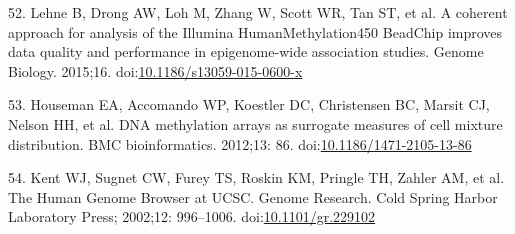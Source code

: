 \documentclass[]{article}
\theoremstyle{definition}
\theoremstyle{definition}
\theoremstyle{definition}
\theoremstyle{remark}
\begin{document}
52. Lehne B, Drong AW, Loh M, Zhang W, Scott WR, Tan ST, et al. A
coherent approach for analysis of the Illumina HumanMethylation450
BeadChip improves data quality and performance in epigenome-wide
association studies. Genome Biology. 2015;16.
doi:\href{http://dx.doi.org/10.1186/s13059-015-0600-x}{10.1186/s13059-015-0600-x}

53. Houseman EA, Accomando WP, Koestler DC, Christensen BC, Marsit CJ,
Nelson HH, et al. DNA methylation arrays as surrogate measures of cell
mixture distribution. BMC bioinformatics. 2012;13: 86.
doi:\href{http://dx.doi.org/10.1186/1471-2105-13-86}{10.1186/1471-2105-13-86}

54. Kent WJ, Sugnet CW, Furey TS, Roskin KM, Pringle TH, Zahler AM, et
al. The Human Genome Browser at UCSC. Genome Research. Cold Spring
Harbor Laboratory Press; 2002;12: 996--1006.
doi:\href{http://dx.doi.org/10.1101/gr.229102}{10.1101/gr.229102}
\end{document}
